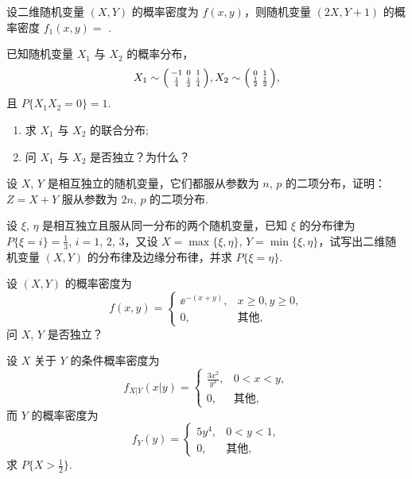 	\begin{titwo}
		设二维随机变量 $(X,Y)$ 的概率密度为 $f(x,y)$，则随机变量 $(2X,Y+1)$ 的概率密度 $f_{1}(x,y) = $ \htwo.
	\end{titwo}

	\begin{titwo}
		已知随机变量 $X_{1}$ 与 $X_{2}$ 的概率分布，
		\[
			X_{1} \sim \begin{psmallmatrix}
				-1 & 0 & 1 \\
				\frac{1}{4} & \frac{1}{2} & \frac{1}{4}
			\end{psmallmatrix},
			X_{2} \sim \begin{psmallmatrix}
				0 & 1 \\
				\frac{1}{2} & \frac{1}{2}
			\end{psmallmatrix},
		\]
		且 $P\{ X_{1} X_{2} = 0 \} = 1$.
		\begin{enumerate}
			\item 求 $X_{1}$ 与 $X_{2}$ 的联合分布;
			\item 问 $X_{1}$ 与 $X_{2}$ 是否独立？为什么？
		\end{enumerate}
	\end{titwo}

	\begin{titwo}
		设 $X$, $Y$ 是相互独立的随机变量，它们都服从参数为 $n$, $p$ 的二项分布，证明：$Z = X + Y$ 服从参数为 $2n$, $p$ 的二项分布.
	\end{titwo}

	\begin{titwo}
		设 $\xi$, $\eta$ 是相互独立且服从同一分布的两个随机变量，已知 $\xi$ 的分布律为 $P\{ \xi = i \} = \frac{1}{3}$, $i = 1$, $2$, $3$，又设 $X = \max \{ \xi,\eta \}$, $Y = \min \{ \xi,\eta \}$，试写出二维随机变量 $(X,Y)$ 的分布律及边缘分布律，并求 $P\{ \xi = \eta \}$.
	\end{titwo}

	\begin{titwo}
		设 $(X,Y)$ 的概率密度为
		\[
			f(x,y) = \begin{cases}
				\ee^{-(x + y)}, & x \geq 0, y \geq 0, \\
				0, & \text{其他},
			\end{cases}
		\]
		问 $X$, $Y$ 是否独立？
	\end{titwo}

	\begin{titwo}
		设 $X$ 关于 $Y$ 的条件概率密度为
		\[
			f_{X|Y}(x|y) = \begin{cases}
				\frac{3x^{2}}{y^{3}}, & 0 < x < y, \\
				0, & \text{其他},
			\end{cases}
		\]
		而 $Y$ 的概率密度为
		\[
			f_{Y}(y) = \begin{cases}
				5y^{4}, & 0 < y < 1, \\
				0, & \text{其他},
			\end{cases}
		\]
		求 $P \bigl\{ X > \frac{1}{2} \bigr\}$.
	\end{titwo}


